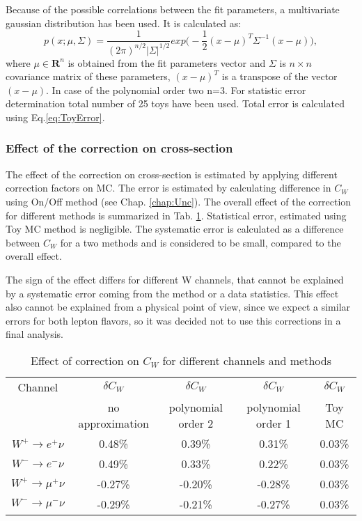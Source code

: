 Because of the possible correlations between the fit parameters, a multivariate gaussian distribution has been used. It  is calculated as:
\begin{equation}
p(x;\mu, \Sigma) =\frac{1}{(2\pi)^{n/2}|\Sigma|^{1/2}} exp\Big(-\frac{1}{2}(x-\mu)^{T}\Sigma^{-1}(x-\mu)\Big),
\end{equation}
where $\mu\in \boldsymbol{R}^{n}$ is obtained from the fit parameters vector and $\Sigma$ is $n \times n$ covariance matrix of these parameters, $(x-\mu)^{T}$ is a transpose of the vector $(x-\mu)$. In case of the polynomial order two n=3. For statistic error determination total number of 25 toys have been used. Total error is calculated using Eq.\ref{eq:ToyError}.

\subsubsection{Effect of the \sumet correction on cross-section}
The effect of the \sumet correction on cross-section is estimated by applying different correction factors on MC. The error is estimated by calculating difference in $C_{W}$ using On/Off method (see Chap. \ref{chap:Unc}). The overall effect of the \sumet correction for different methods is summarized in Tab. \ref{SumetCW}. Statistical error, estimated using Toy MC method is negligible. The systematic error is calculated as a difference between $C_{W}$ for a two methods and is considered to be small, compared to the overall effect. 

The sign of the effect differs for different W channels, that cannot be explained by a systematic error coming from the method or a data statistics. This effect also cannot be explained from a physical point of view, since we expect a similar errors for both lepton flavors, so it was decided not to use this corrections in a final analysis.

 \begin{table}[!t]
 \caption{Effect of \sumet correction on $C_{W}$ for different channels and methods}
\label{SumetCW}
\begin{center}
\begin{tabular}{c | c | c |  c |  c   }
\hline
Channel & $\delta C_W$ & $\delta C_W$ & $\delta C_W$ & $\delta C_W$ \\
& no approximation & polynomial order 2 & polynomial order 1 & Toy MC \\
\hline
\hline
$W^{+} \to e^{+}\nu$ & 0.48\% &0.39\%  & 0.31\% & 0.03\% \\
$W^{-} \to e^{-}\nu$ & 0.49\% &0.33\%  & 0.22\% & 0.03\% \\
$W^{+} \to \mu^{+}\nu$ & -0.27\% &-0.20\%  & -0.28\% & 0.03\% \\
$W^{-} \to \mu^{-}\nu$ & -0.29\% &-0.21\%  & -0.27\% & 0.03\% \\
\hline
\end{tabular}
\end{center}

\end{table}


